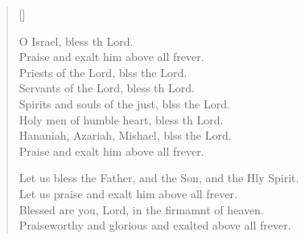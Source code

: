 \begin{verse}[\versewidth]
\begin{patverse}
O Israel, bless th Lord.\Med\\
Praise and exalt him above all frever.\\
Priests of the Lord, blss the Lord.\Med\\
Servants of the Lord, bless th Lord.\\
Spirits and souls of the just, blss the Lord.\Med\\
Holy men of humble heart, bless th Lord.\\
Hananiah, Azariah, Mishael, blss the Lord.\Med\\
Praise and exalt him above all frever.

Let us bless the Father, and the Son, and the Hly Spirit.\Med\\
Let us praise and exalt him above all frever.\\
Blessed are you, Lord, in the firmamnt of heaven.\Med\\
Praiseworthy and glorious and exalted above all frever.
  \end{patverse}
\end{verse}
